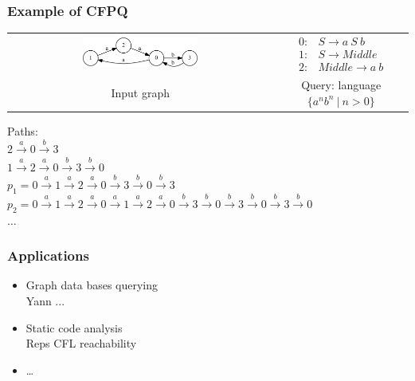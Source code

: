 \documentclass[xcolor=table]{beamer}
\begin{document}
\begin{frame} \frametitle{Example of CFPQ}

\begin{center}
  \begin{tabular}{  c  c  }
      \includegraphics[width=0.45\textwidth]{pictures/input.pdf}
      &
  $

  \begin{array}{rl}
     0:& S \rightarrow a \ S \ b \\
     1:& S \rightarrow Middle \\
     2:& Middle \rightarrow a \ b
  \end{array}

  $
  \\
  Input graph
  &
  Query: language $\{a^nb^n \ | \ n > 0 \}$

  \end{tabular}
\end{center}
\vspace{0.5cm}
Paths: \\
$2 \xrightarrow{a} 0 \xrightarrow{b} 3$ \\
$1 \xrightarrow{a} 2 \xrightarrow{a} 0 \xrightarrow{b} 3 \xrightarrow{b} 0$ \\
$p_1 = 0 \xrightarrow{a} 1 \xrightarrow{a} 2 \xrightarrow{a} 0 \xrightarrow{b} 3 \xrightarrow{b} 0 \xrightarrow{b} 3$ \\
$p_2 = 0 \xrightarrow{a} 1 \xrightarrow{a} 2 \xrightarrow{a} 0 \xrightarrow{a} 1 \xrightarrow{a} 2 \xrightarrow{a} 0 \xrightarrow{b} 3 \xrightarrow{b} 0 \xrightarrow{b} 3 \xrightarrow{b} 0 \xrightarrow{b} 3 \xrightarrow{b} 0$ \\
$\dots$

\end{frame}


\begin{frame} \frametitle{Applications}
\begin{itemize}
\item Graph data bases querying \\
Yann ...
\item Static code analysis \\
Reps CFL reachability
\item \dots
\end{itemize}
\end{frame}
\end{document}
